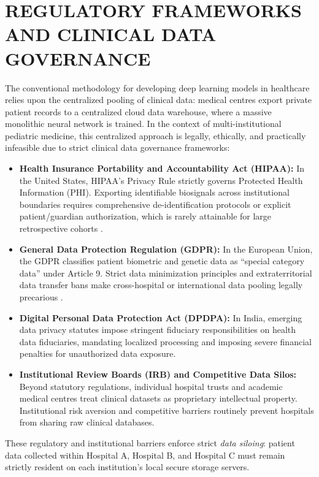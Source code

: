 \documentclass[12pt,a4paper]{amritareport}
\begin{document}
\section{REGULATORY FRAMEWORKS AND CLINICAL DATA GOVERNANCE}

The conventional methodology for developing deep learning models in healthcare relies upon the centralized pooling of clinical data: medical centres export private patient records to a centralized cloud data warehouse, where a massive monolithic neural network is trained. In the context of multi-institutional pediatric medicine, this centralized approach is legally, ethically, and practically infeasible due to strict clinical data governance frameworks:
\begin{itemize}
	\item \textbf{Health Insurance Portability and Accountability Act (HIPAA):} In the United States, HIPAA's Privacy Rule strictly governs Protected Health Information (PHI). Exporting identifiable biosignals across institutional boundaries requires comprehensive de-identification protocols or explicit patient/guardian authorization, which is rarely attainable for large retrospective cohorts \cite{kaissis2020secure}.
	\item \textbf{General Data Protection Regulation (GDPR):} In the European Union, the GDPR classifies patient biometric and genetic data as ``special category data'' under Article 9. Strict data minimization principles and extraterritorial data transfer bans make cross-hospital or international data pooling legally precarious \cite{rumbold2017effect}.
	\item \textbf{Digital Personal Data Protection Act (DPDPA):} In India, emerging data privacy statutes impose stringent fiduciary responsibilities on health data fiduciaries, mandating localized processing and imposing severe financial penalties for unauthorized data exposure.
	\item \textbf{Institutional Review Boards (IRB) and Competitive Data Silos:} Beyond statutory regulations, individual hospital trusts and academic medical centres treat clinical datasets as proprietary intellectual property. Institutional risk aversion and competitive barriers routinely prevent hospitals from sharing raw clinical databases.
\end{itemize}

These regulatory and institutional barriers enforce strict \textit{data siloing}: patient data collected within Hospital A, Hospital B, and Hospital C must remain strictly resident on each institution's local secure storage servers.
\end{document}
